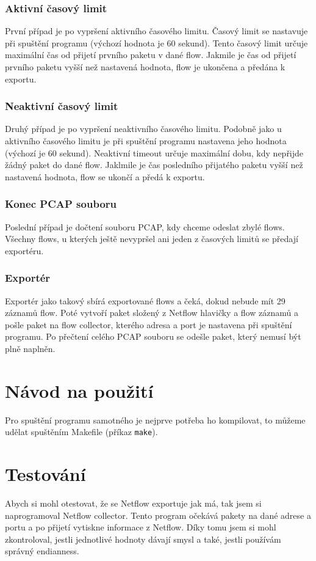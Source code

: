 \documentclass{article}
\begin{document}
\subsubsection{Aktivní časový limit}
První případ je po vypršení aktivního časového limitu. Časový limit se
nastavuje při spuštění programu (výchozí hodnota je 60 sekund). Tento časový
limit určuje maximální čas od přijetí prvního paketu v dané flow. Jakmile je
čas od přijetí prvního paketu vyšší než nastavená hodnota, flow je ukončena
a předána k exportu.

\subsubsection{Neaktivní časový limit}
Druhý případ je po vypršení neaktivního časového limitu. Podobně jako u
aktivního časového limitu je při spuštění programu nastavena jeho hodnota
(výchozí je 60 sekund). Neaktivní timeout určuje maximální dobu, kdy nepřijde
žádný paket do dané flow. Jaklmile je čas posledního přijatého paketu vyšší
než nastavená hodnota, flow se ukončí a předá k exportu.

\subsubsection{Konec PCAP souboru}
Poslední případ je dočtení souboru PCAP, kdy chceme odeslat zbylé flows.
Všechny flows, u kterých ještě nevypršel ani jeden z časových limitů se předají
exportéru.

\subsubsection{Exportér}
Exportér jako takový sbírá exportované flows a čeká, dokud nebude mít 29
záznamů flow. Poté vytvoří paket složený z Netflow hlavičky a flow záznamů a
pošle paket na flow collector, kterého adresa a port je nastavena při spuštění
programu. Po přečtení celého PCAP souboru se odešle paket, který nemusí být
plně naplněn.

\section{Návod na použití}
Pro spuštění programu samotného je nejprve potřeba ho kompilovat, to můžeme
udělat spuštěním Makefile (příkaz \texttt{make}).

\section{Testování}
Abych si mohl otestovat, že se Netflow exportuje jak má, tak jsem si
naprogramoval Netflow collector. Tento program očekává pakety na dané adrese
a portu a po přijetí vytiskne informace z Netflow. Díky tomu jsem si mohl
zkontroloval, jestli jednotlivé hodnoty dávají smysl a také, jestli používám
správný endianness.
\end{document}

